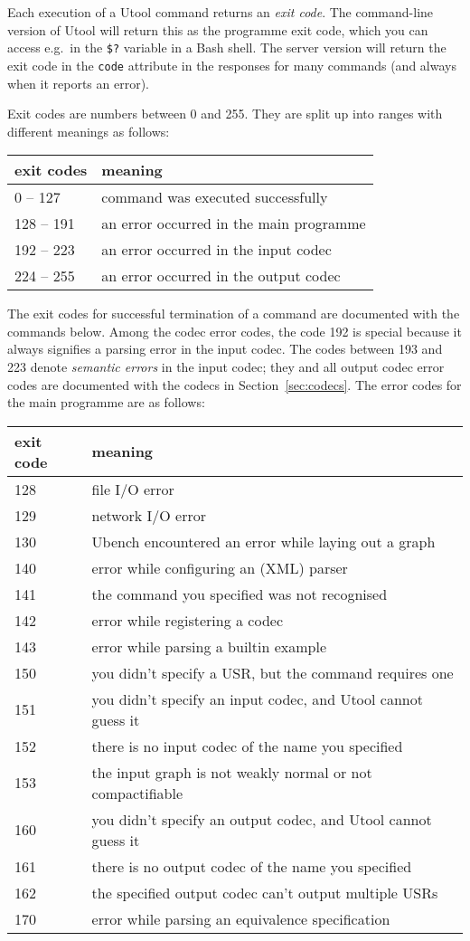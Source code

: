 Each execution of a Utool command returns an \emph{exit code}. The
command-line version of Utool will return this as the programme exit
code, which you can access e.g.\ in the \texttt{\$?} variable in a
Bash shell. The server version will return the exit code in the
\verb?code? attribute in the responses for many commands (and always
when it reports an error).

Exit codes are numbers between 0 and 255. They are split up into
ranges with different meanings as follows:

\begin{tabular}{l|l}
exit codes & meaning \\\hline
0 -- 127 & command was executed successfully \\
128 -- 191 & an error occurred in the main programme \\
192 -- 223 & an error occurred in the input codec \\
224 -- 255 & an error occurred in the output codec
\end{tabular}

The exit codes for successful termination of a command are documented
with the commands below. Among the codec error codes, the code 192 is
special because it always signifies a parsing error in the input
codec. The codes between 193 and 223 denote \emph{semantic errors} in
the input codec; they and all output codec error codes are documented
with the codecs in Section~\ref{sec:codecs}. The error codes for the
main programme are as follows:

\begin{tabular}{l|l}
exit code & meaning \\\hline
128 & file I/O error \\
129 & network I/O error \\
130 & Ubench encountered an error while laying out a graph \\

140 & error while configuring an (XML) parser \\
141 & the command you specified was not recognised \\
142 & error while registering a codec \\
143 & error while parsing a builtin example \\

150 & you didn't specify a USR, but the command requires one \\
151 & you didn't specify an input codec, and Utool cannot guess it \\
152 & there is no input codec of the name you specified \\
153 & the input graph is not weakly normal or not compactifiable \\

160 & you didn't specify an output codec, and Utool cannot guess it \\
161 & there is no output codec of the name you specified \\
162 & the specified output codec can't output multiple USRs \\

170 & error while parsing an equivalence specification
\end{tabular}




